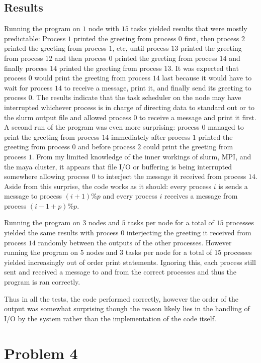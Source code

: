 \documentclass[11pt]{article}
\begin{document}
\subsection{Results}
Running the program on $1$ node with $15$ tasks yielded results that were mostly predictable: Process $1$ printed the greeting from process $0$ first, then process $2$ printed the greeting from process $1$, etc, until process $13$ printed the greeting from process $12$ and then process $0$ printed the greeting from process $14$ and finally process $14$ printed the greeting from process $13$. It was expected that process $0$ would print the greeting from process $14$ last because it would have to wait for process $14$ to receive a message, print it, and finally send its greeting to process $0$. The results indicate that the task scheduler on the node may have interrupted whichever process is in charge of directing data to standard out or to the slurm output file and allowed process $0$ to receive a message and print it first. A second run of the program was even more surprising: process $0$ managed to print the greeting from process $14$ immediately after process $1$ printed the greeting from process $0$ and before process $2$ could print the greeting from process $1$. From my limited knowledge of the inner workings of slurm, MPI, and the maya cluster, it appears that file I/O or buffering is being interrupted somewhere allowing process $0$ to interject the message it received from process $14$. Aside from this surprise, the code works as it should: every process $i$ is sends a message to process $(i+1)\%p$ and every process $i$  receives a message from process $(i-1+p) \% p$.

Running the program on $3$ nodes and $5$ tasks per node for a total of $15$ processes yielded the same results with process $0$ interjecting the greeting it received from process $14$ randomly between the outputs of the other processes. However running the program on $5$ nodes and $3$ tasks per node for a total of $15$ processes yielded increasingly out of order print statements. Ignoring this, each process still sent and received a message to and from the correct processes and thus the program is ran correctly.

Thus in all the tests, the code performed correctly, however the order of the output was somewhat surprising though the reason likely lies in the handling of I/O by the system rather than the implementation of the code itself.

\pagebreak

\pagebreak

\section{Problem 4}
\end{document}
